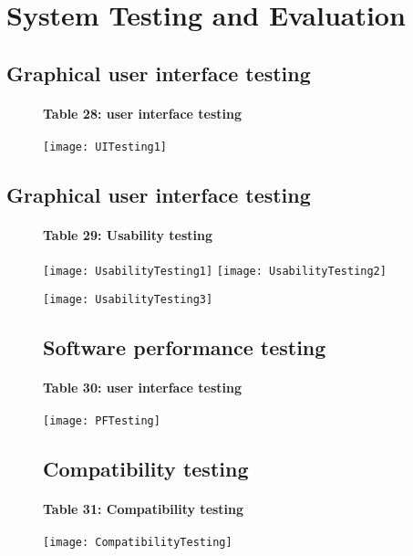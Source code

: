 \chapter{System Testing and Evaluation}\label{chap:testingEvaluation}

\section{Graphical user interface testing}
\begin{figure}[ht]
\subsubsection{Table 28: user interface testing}
\centering
\texttt{[image: UITesting1]}
\end{figure}

\section{Graphical user interface testing}
\begin{figure}[ht]
\subsubsection{Table 29: Usability testing}
\centering
\texttt{[image: UsabilityTesting1]}
\texttt{[image: UsabilityTesting2]}
\end{figure}

\begin{figure}
\centering
\texttt{[image: UsabilityTesting3]}
\end{figure}

\begin{figure}
\section{Software performance testing}
\subsubsection{Table 30: user interface testing}
\centering
\texttt{[image: PFTesting]}
\end{figure}

\begin{figure}
\section{Compatibility testing}
\subsubsection{Table 31: Compatibility testing}
\centering
\texttt{[image: CompatibilityTesting]}
\end{figure}

